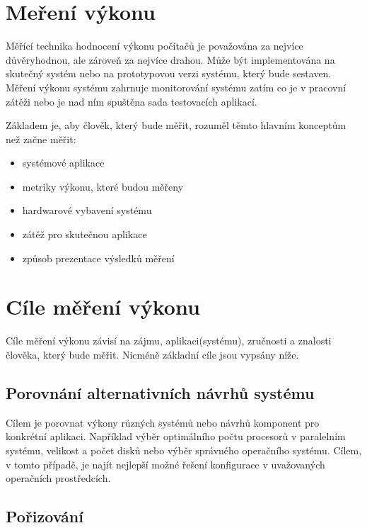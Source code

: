 \section{Meření výkonu}

Měřící technika hodnocení výkonu počítačů je považována za nejvíce důvěryhodnou, ale zároveň za nejvíce drahou. Může být implementována na skutečný systém nebo na prototypovou verzi systému, který bude sestaven. Měření výkonu systému zahrnuje monitorování systému zatím co je v pracovní zátěži nebo je nad ním spuštěna sada testovacích aplikací.

Základem je, aby člověk, který bude měřit, rozuměl těmto hlavním konceptům než začne měřit:
\begin{itemize}[noitemsep]
    \item{systémové aplikace}
    \item{metriky výkonu, které budou měřeny}
    \item{hardwarové vybavení systému}
    \item{zátěž pro skutečnou aplikace}
    \item{způsob prezentace výsledků měření}
\end{itemize}

\section{Cíle měření výkonu}

Cíle měření výkonu závisí na zájmu, aplikaci(systému), zručnosti a znalosti člověka, který bude měřit. Nicméně základní cíle jsou vypsány níže.

\subsection*{Porovnání alternativních návrhů systému}

Cílem je porovnat výkony různých systémů nebo návrhů komponent pro konkrétní aplikaci. Například výběr optimálního počtu procesorů v paralelním systému, velikost a počet disků nebo výběr správného operačního systému. Cílem, v tomto případě, je najít nejlepší možné řešení konfigurace v uvažovaných operačních prostředcích.

\subsection*{Pořizování}

